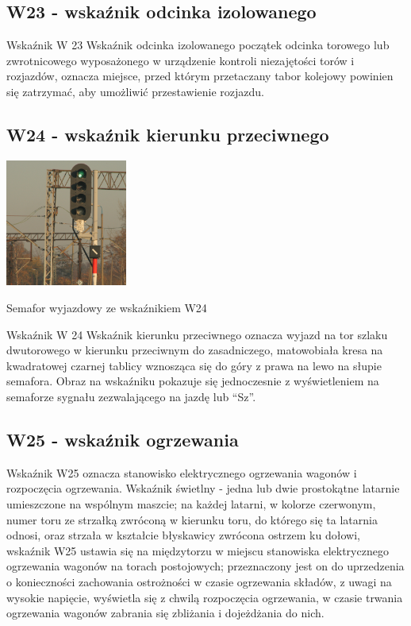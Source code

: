 \subsection{W23 - wskaźnik odcinka izolowanego}

Wskaźnik W 23 {\textquotedbl}Wskaźnik odcinka izolowanego{\textquotedbl} początek odcinka torowego lub zwrotnicowego
wyposażonego w urządzenie kontroli niezajętości torów i rozjazdów, oznacza miejsce, przed którym przetaczany tabor
kolejowy powinien się zatrzymać, aby umożliwić przestawienie rozjazdu.

\subsection{W24 - wskaźnik kierunku przeciwnego}

	\begin{marginfigure}
	\includegraphics[width=4cm]{skryptkierownik-img/skryptkierownik-img018.jpg}
	\caption{Semafor wyjazdowy ze wskaźnikiem W24}
\end{marginfigure}
Wskaźnik W 24 {\textquotedbl}Wskaźnik kierunku przeciwnego{\textquotedbl} oznacza wyjazd na tor szlaku dwutorowego w kierunku przeciwnym do zasadniczego, matowobiała kresa na kwadratowej czarnej tablicy wznosząca się do góry z prawa na lewo na słupie semafora. Obraz na wskaźniku pokazuje się jednoczesnie z wyświetleniem na semaforze sygnału zezwalającego na jazdę lub “Sz”. 

\subsection{W25 - wskaźnik ogrzewania}

Wskaźnik W25 oznacza stanowisko elektrycznego ogrzewania wagonów i rozpoczęcia ogrzewania. Wskaźnik świetlny - jedna lub dwie prostokątne latarnie umieszczone na wspólnym maszcie; na każdej latarni, w kolorze czerwonym, numer toru ze strzałką zwróconą w kierunku toru, do którego się ta latarnia odnosi, oraz strzała w kształcie błyskawicy zwrócona ostrzem ku dołowi, wskaźnik W25 ustawia się na międzytorzu w miejscu stanowiska elektrycznego ogrzewania wagonów na torach postojowych; przeznaczony jest on do uprzedzenia o konieczności zachowania ostrożności w czasie ogrzewania składów, z uwagi na wysokie napięcie, wyświetla się z chwilą rozpoczęcia ogrzewania, w czasie trwania ogrzewania wagonów zabrania się zbliżania i dojeżdżania do nich.

